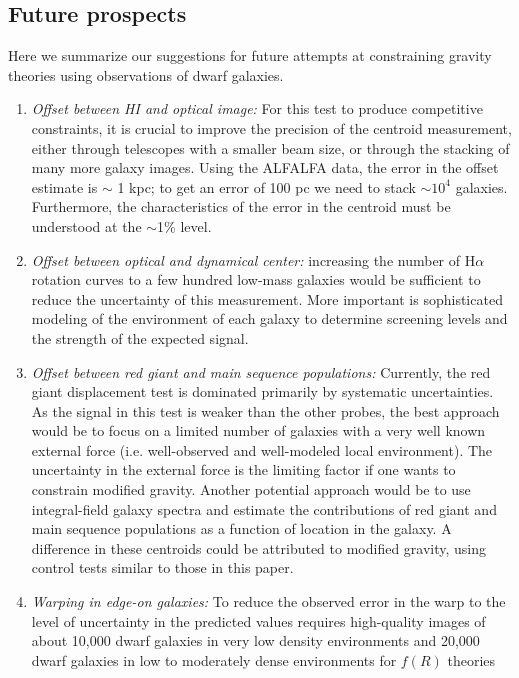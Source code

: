 \documentclass[useAMS,usenatbib,twocolumn]{mn2e}
\newcommand{\ha}{H$\alpha$}
\begin{document}
\subsection{Future prospects}
Here we summarize our suggestions for future attempts at constraining
gravity theories using observations of dwarf galaxies.
\begin{enumerate}
\item {\it Offset between HI and optical image:}
  For this test to produce competitive constraints, it is crucial to improve
  the precision of the centroid measurement, either through telescopes with
  a smaller beam size, or through the stacking of many more galaxy images.
  Using the ALFALFA data, the error in the offset estimate is $\sim$ 1 kpc;
  to get an error of 100 pc we need to stack $\sim 10^{4}$
  galaxies.  Furthermore, the characteristics of the error
  in the centroid must be understood at the $\sim$1\% level.
\item {\it Offset between optical and dynamical center:}
  increasing the number of \ha~ rotation curves to a few hundred 
  low-mass galaxies would be sufficient to reduce the uncertainty of
  this measurement.  More important is sophisticated
  modeling of the environment of each galaxy to determine screening levels and
  the strength of the expected signal.
\item {\it Offset between red giant and main sequence populations:}
  Currently, the red giant displacement test is dominated primarily by
  systematic uncertainties. As the signal in this test is weaker than the
  other probes, the best approach would be to focus on a limited number
  of galaxies with a very well known external force (i.e. well-observed and
  well-modeled local environment). The uncertainty in the external force is the
  limiting factor if one wants to constrain modified gravity.  Another potential
  approach would be to use integral-field galaxy spectra and estimate the
  contributions of red giant and main sequence populations as a function of
  location in the galaxy.  A difference in these centroids could be
  attributed to modified gravity, using control tests similar to those in
  this paper.
\item {\it Warping in edge-on galaxies:}
  To reduce the observed error in the warp to the level of uncertainty in the 
  predicted values requires high-quality images
  of about 10,000 dwarf galaxies in very low density environments and 20,000
  dwarf galaxies in low to moderately dense environments for $f(R)$ theories

\end{enumerate}
\end{document}
